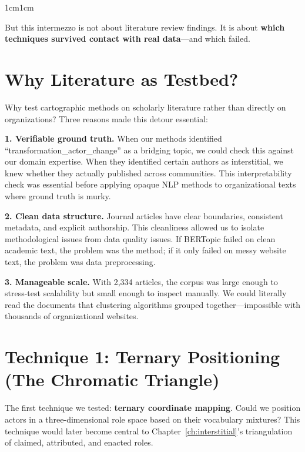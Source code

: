 \documentclass[../main.tex]{subfiles}
\begin{document}
\begin{adjustwidth}{1cm}{1cm}

But this intermezzo is not about literature review findings. It is about \textbf{which techniques survived contact with real data}---and which failed.

\vspace{0.8cm}

\section*{Why Literature as Testbed?}

Why test cartographic methods on scholarly literature rather than directly on organizations? Three reasons made this detour essential:


\noindent\textbf{1. Verifiable ground truth.} When our methods identified ``transformation\_actor\_change'' as a bridging topic, we could check this against our domain expertise. When they identified certain authors as interstitial, we knew whether they actually published across communities. This interpretability check was essential before applying opaque NLP methods to organizational texts where ground truth is murky.

\noindent\textbf{2. Clean data structure.} Journal articles have clear boundaries, consistent metadata, and explicit authorship. This cleanliness allowed us to isolate methodological issues from data quality issues. If BERTopic failed on clean academic text, the problem was the method; if it only failed on messy website text, the problem was data preprocessing.

\noindent\textbf{3. Manageable scale.} With 2,334 articles, the corpus was large enough to stress-test scalability but small enough to inspect manually. We could literally read the documents that clustering algorithms grouped together---impossible with thousands of organizational websites.

\vspace{0.8cm}

\section*{Technique 1: Ternary Positioning (The Chromatic Triangle)}

The first technique we tested: \textbf{ternary coordinate mapping}. Could we position actors in a three-dimensional role space based on their vocabulary mixtures? This technique would later become central to Chapter~\ref{ch:interstitial}'s triangulation of claimed, attributed, and enacted roles.


\end{adjustwidth}
\end{document}
